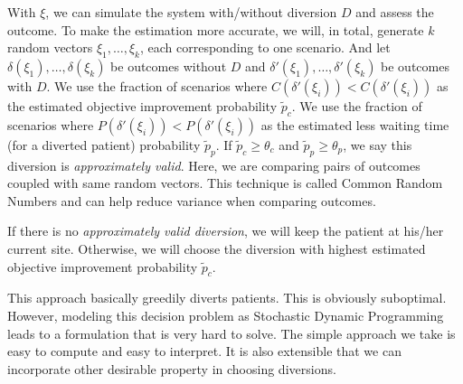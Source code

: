 With $\xi$, we can simulate the system with/without diversion $D$
and assess the outcome. To make the estimation more accurate, we will,
in total, generate $k$ random vectors $\xi_1, \ldots, \xi_k$, each
corresponding to one scenario. And let $\delta(\xi_1), \ldots,
\delta(\xi_k)$ be outcomes without $D$ and $\delta'(\xi_1), \ldots,
\delta'(\xi_k)$ be outcomes with $D$. We use the fraction of
scenarios where $C(\delta'(\xi_i)) < C(\delta'(\xi_i))$ as
the estimated objective improvement probability $\tilde p_c$. We use the fraction
of scenarios where $P(\delta'(\xi_i)) < P(\delta'(\xi_i))$ as the
estimated less waiting time (for a diverted patient) probability $\tilde p_p$.
If $\tilde p_c \ge \theta_c$ and $\tilde p_p \ge \theta_p$, we say
this diversion is \textit{approximately valid}. Here, we are
comparing pairs of outcomes coupled with same random vectors.
This technique is called Common Random Numbers and can help
reduce variance when comparing outcomes.

If there is no \textit{approximately valid diversion}, we will
keep the patient at his/her current site. Otherwise, we will
choose the diversion with highest estimated objective improvement
probability $\tilde p_c$.

This approach basically greedily diverts patients. This is obviously
suboptimal. However, modeling this decision problem as Stochastic
Dynamic Programming leads to a formulation that is very hard to
solve. The simple approach we take is easy to compute and easy
to interpret. It is also extensible that we can incorporate other
desirable property in choosing diversions.
